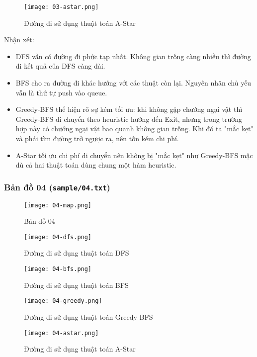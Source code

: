 \documentclass[12pt]{article}
\begin{document}
\begin{figure}[H]
	\centering
	\texttt{[image: 03-astar.png]}
	\caption{Đường đi sử dụng thuật toán A-Star}
\end{figure}

Nhận xét:
\begin{itemize}
\item DFS vẫn có đường đi phức tạp nhất. Không gian trống càng nhiều thì đường đi kết quả của DFS càng dài.
\item BFS cho ra đường đi khác hướng với các thuật còn lại. Nguyên nhân chủ yếu vẫn là thứ tự push vào queue.
\item Greedy-BFS thể hiện rõ sự kém tối ưu: khi không gặp chướng ngại vật thì Greedy-BFS di chuyển theo heuristic hướng đến Exit, nhưng trong trường hợp này có chướng ngại vật bao quanh không gian trống. Khi đó ta "mắc kẹt" và phải tìm đường trở ngược ra, nên tốn kém chi phí.
\item A-Star tối ưu chi phí di chuyển nên không bị "mắc kẹt" như Greedy-BFS mặc dù cả hai thuật toán dùng chung một hàm heuristic.
\end{itemize}

\subsubsection{Bản đồ 04 (\texttt{sample/04.txt})}
\begin{figure}[H]
	\centering
	\texttt{[image: 04-map.png]}
	\caption{Bản đồ 04}
\end{figure}

\begin{figure}[H]
	\centering
	\texttt{[image: 04-dfs.png]}
	\caption{Đường đi sử dụng thuật toán DFS}
\end{figure}

\begin{figure}[H]
	\centering
	\texttt{[image: 04-bfs.png]}
	\caption{Đường đi sử dụng thuật toán BFS}
\end{figure}

\begin{figure}[H]
	\centering
	\texttt{[image: 04-greedy.png]}
	\caption{Đường đi sử dụng thuật toán Greedy BFS}
\end{figure}

\begin{figure}[H]
	\centering
	\texttt{[image: 04-astar.png]}
	\caption{Đường đi sử dụng thuật toán A-Star}
\end{figure}
\end{document}
